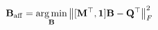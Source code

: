 \documentclass[preview]{standalone}
\begin{document}
\begin{align*}
\special{dvisvgm:raw <g id='unique000'>}\mathbf B_{\rm aff}=\underset{\mathbf B}{\operatorname*{arg\,min}}\left\|[\mathbf M^{\top},\mathbf 1]\mathbf B-\mathbf Q^{\top}\right\|_F^2\special{dvisvgm:raw </g>}
\end{align*}
\end{document}
